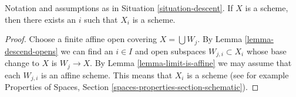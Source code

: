 \begin{lemma}
\label{lemma-limit-is-scheme}
Notation and assumptions as in Situation \ref{situation-descent}.
If $X$ is a scheme, then there exists an $i$ such that $X_i$ is a scheme.
\end{lemma}

\begin{proof}
Choose a finite affine open covering $X = \bigcup W_j$.
By Lemma \ref{lemma-descend-opens}
we can find an $i \in I$ and open subspaces $W_{j, i} \subset X_i$
whose base change to $X$ is $W_j \to X$. By
Lemma \ref{lemma-limit-is-affine} we may assume that
each $W_{j, i}$ is an affine scheme. This means that $X_i$
is a scheme (see for example
Properties of Spaces, Section \ref{spaces-properties-section-schematic}).
\end{proof}
